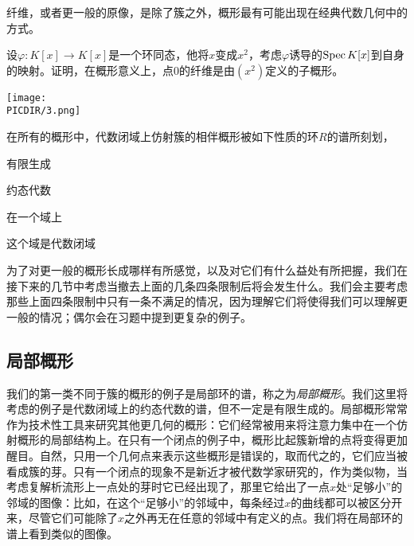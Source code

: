 纤维，或者更一般的原像，是除了簇之外，概形最有可能出现在经典代数几何中的方式。

\begin{exe} \label{exe:2.2}
设$\varphi:K[x]\to K[x]$是一个环同态，他将$x$变成$x^2$，考虑$\varphi$诱导的$\operatorname{Spec} K[x]$到自身的映射。证明，在概形意义上，点$0$的纤维是由$(x^2)$定义的子概形。

\begin{center}\texttt{[image: \\PICDIR/3.png]}\end{center}
\end{exe}

在所有的概形中，代数闭域上仿射簇的相伴概形被如下性质的环$R$的谱所刻划，
\begin{compactitem}[~~~--]
\item 有限生成
\item 约态代数
\item 在一个域上
\item 这个域是代数闭域
\end{compactitem}

为了对更一般的概形长成哪样有所感觉，以及对它们有什么益处有所把握，我们在接下来的几节中考虑当撤去上面的几条四条限制后将会发生什么。我们会主要考虑那些上面四条限制中只有一条不满足的情况，因为理解它们将使得我们可以理解更一般的情况；偶尔会在习题中提到更复杂的例子。

\subsection{局部概形}

我们的第一类不同于簇的概形的例子是局部环的谱，称之为\textit{局部概形}。我们这里将考虑的例子是代数闭域上的约态代数的谱，但不一定是有限生成的。局部概形常常作为技术性工具来研究其他更几何的概形：它们经常被用来将注意力集中在一个仿射概形的局部结构上。在只有一个闭点的例子中，概形比起簇新增的点将变得更加醒目。自然，只用一个几何点来表示这些概形是错误的，取而代之的，它们应当被看成簇的芽。只有一个闭点的现象不是新近才被代数学家研究的，作为类似物，当考虑复解析流形上一点处的芽时它已经出现了，那里它给出了一点$x$处“足够小”的邻域的图像：比如，在这个“足够小”的邻域中，每条经过$x$的曲线都可以被区分开来，尽管它们可能除了$x$之外再无在任意的邻域中有定义的点。我们将在局部环的谱上看到类似的图像。

